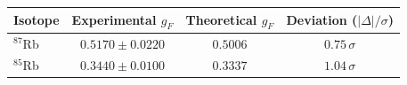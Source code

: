 \begin{tabular}{lccc}
  \hline
  Isotope & Experimental $g_F$ & Theoretical $g_F$ & Deviation ($|\Delta|/\sigma$) \\
  \hline
  $^{87}$Rb & $0.5170 \pm 0.0220$ & $0.5006$ & $0.75\,\sigma$ \\
  $^{85}$Rb & $0.3440 \pm 0.0100$ & $0.3337$ & $1.04\,\sigma$ \\
  \hline
\end{tabular}